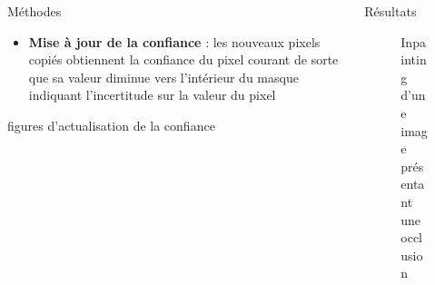\documentclass[final,hyperref={pdfpagelabels=false}]{beamer}
\begin{document}
\begin{frame}[t]
\begin{columns}[t]
\begin{column}{.465\textwidth}
\begin{block}{\Large Méthodes}
\begin{itemize}
\item \textbf{Mise à jour de la confiance} : les nouveaux pixels copiés obtiennent la confiance du pixel courant de sorte que sa valeur diminue vers l'intérieur du masque indiquant l'incertitude sur la valeur du pixel
\end{itemize}

figures d'actualisation de la confiance 
\end{block}

\end{column}


\begin{column}{.465\textwidth}


\begin{block}{\Large Résultats}

\begin{figure}[H]
\centering
{}
\caption{Inpainting d'une image présentant une occlusion}
\end{figure}


\end{block}
\end{column}
\end{columns}
\end{frame}
\end{document}
